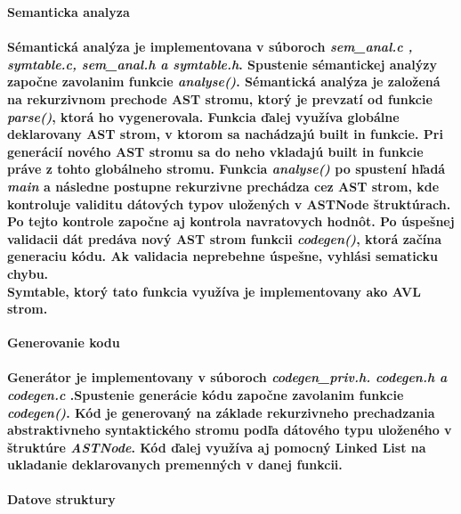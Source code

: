 \documentclass[12pt]{article}
\begin{document}
 \Large \textbf{Semanticka analyza}\normalsize \\
\noindent\makebox[\linewidth]{\rule{\textwidth}{0.4pt}}

\paragraph{Sémantická analýza je implementovana v súboroch \textit{sem\_anal.c , symtable.c, sem\_anal.h a symtable.h}. Spustenie sémantickej analýzy započne zavolanim funkcie \textit{analyse()}. Sémantická analýza je založená na rekurzivnom prechode AST stromu, ktorý je prevzatí od funkcie \textit{parse()}, ktorá ho vygenerovala. Funkcia ďalej využíva globálne deklarovany AST strom, v ktorom sa nachádzajú built in funkcie. Pri generácií nového AST stromu sa do neho vkladajú built in funkcie práve z tohto globálneho stromu. Funkcia \textit{analyse()} po spustení hľadá \textit{main} a následne postupne rekurzivne prechádza cez AST strom, kde kontroluje validitu dátových typov uložených v ASTNode štruktúrach. Po tejto kontrole započne aj kontrola navratovych hodnôt. Po úspešnej validacii dát predáva nový AST strom funkcii \textit{codegen()}, ktorá začína generaciu kódu. Ak validacia neprebehne úspešne, vyhlási sematicku chybu. \newline \\
Symtable, ktorý tato funkcia využíva je implementovany ako AVL strom.  \newline \\}

 \Large \textbf{Generovanie kodu} \normalsize \\
\noindent\makebox[\linewidth]{\rule{\textwidth}{0.4pt}}

\paragraph{Generátor je implementovany v súboroch \textit{codegen\_priv.h. codegen.h a codegen.c }.Spustenie generácie kódu započne zavolanim funkcie \textit{codegen()}. Kód je generovaný na základe rekurzivneho prechadzania abstraktivneho syntaktického stromu podľa dátového typu uloženého v štruktúre \textit{ASTNode}. Kód ďalej využíva aj pomocný Linked List na ukladanie deklarovanych premenných v danej funkcii. \newline \\}


\newpage

 \Large \textbf{Datove struktury}\normalsize \\
\noindent\makebox[\linewidth]{\rule{\textwidth}{0.4pt}}
\end{document}
